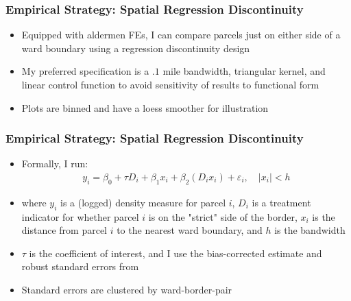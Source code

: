\begin{frame}
    \frametitle{Empirical Strategy: Spatial Regression Discontinuity} 
            \begin{itemize} 
                \item Equipped with aldermen FEs, I can compare parcels just on either side of a ward boundary using a regression discontinuity design 
                \item My preferred specification is a $.1$ mile bandwidth, triangular kernel, and linear control function to avoid sensitivity of results to functional form
                \item Plots are binned and have a loess smoother for illustration
            \end{itemize}
\end{frame}

\begin{frame}
    \frametitle{Empirical Strategy: Spatial Regression Discontinuity} 
            \begin{itemize} 
                \item Formally, I run: 
                \[
                \begin{aligned}
                    y_i=\beta_0+\tau D_i+\beta_1 x_i+\beta_2(D_i x_i)+\varepsilon_i, \quad |x_i| < h
                \end{aligned}
                \]
                \item where $y_i$ is a (logged) density measure for parcel $i$, $D_i$ is a treatment indicator for whether parcel $i$ is on the "strict" side of the border, $x_i$ is the distance from parcel $i$ to the nearest ward boundary, and $h$ is the bandwidth
                \item $\tau$ is the coefficient of interest, and I use the bias-corrected estimate and robust standard errors from {\scriptsize \citep{calonico_robust_2014,calonico_rdrobust_2015}}
                \item Standard errors are clustered by ward-border-pair
            \end{itemize}
\end{frame}



